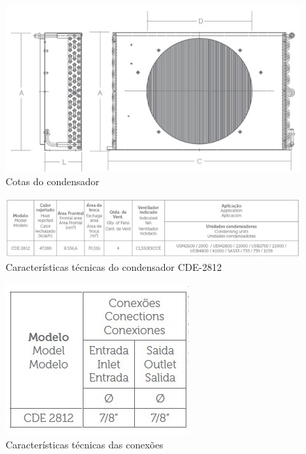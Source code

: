 \begin{figure}[!htbp]
	 \centering
	  \includegraphics[scale=1]{editaveis/figuras/cotas_condensador}
	  \caption[Cotas do condensador]{Cotas do condensador\footnotemark}
	  \label{condensador}
	\end{figure}	   
	\FloatBarrier
	
\begin{figure}[!htbp]
	 \centering
	  \includegraphics[scale=1]{editaveis/figuras/carac_tecnicas_condensador}
	  \caption[Características técnicas do condensador]{Características técnicas do condensador CDE-2812 \footnotemark}
	  \label{condensador}
	\end{figure}	   
	\FloatBarrier
	
\begin{figure}[!htbp]
	 \centering
	  \includegraphics[scale=1]{editaveis/figuras/carac_tecnicas_conexao}
	  \caption[Características técnicas das conexões]{Características técnicas das conexões\footnotemark}
	  \label{condensador}
	\end{figure}	   
	\FloatBarrier


